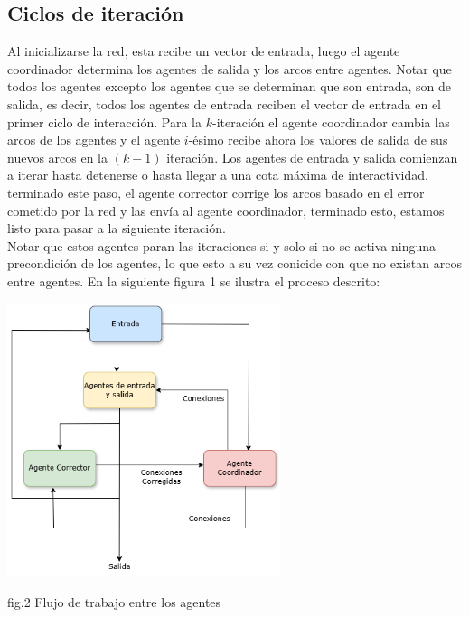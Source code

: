         \subsection*{Ciclos de iteración}

         Al inicializarse la red, esta recibe un vector de entrada, luego el agente coordinador determina los agentes de salida y los arcos entre agentes. Notar que todos los agentes excepto los agentes que se determinan que son entrada, son de salida, es decir, todos los agentes de entrada reciben el vector de entrada en el primer ciclo de interacción. Para la $k$-iteración el agente coordinador cambia las arcos de los agentes y el agente $i$-ésimo recibe ahora los valores de salida de sus nuevos arcos en la $(k-1)$ iteración. Los agentes de entrada y salida comienzan a iterar hasta detenerse o hasta llegar a una cota máxima de interactividad, terminado este paso, el agente corrector corrige los arcos basado en el error cometido por la red y las envía al agente coordinador, terminado esto, estamos listo para pasar a la siguiente iteración. \\

        Notar que estos agentes paran las iteraciones si y solo si no se activa ninguna precondición de los agentes, lo que esto a su vez conicide con que no existan arcos entre agentes. En la siguiente figura 1 se ilustra el proceso descrito: \\


        \begin{center}
                \includegraphics[width=0.6\textwidth]{images/AgentArchitecture.drawio.png}
                \begin{center}
                    fig.2 Flujo de trabajo entre los agentes
                \end{center}
        \end{center}